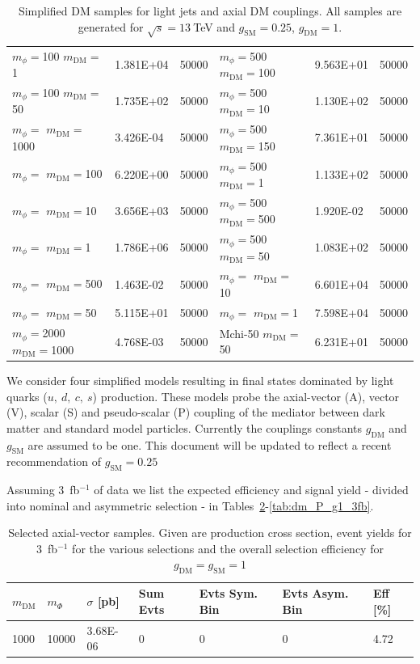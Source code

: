 \begin{table}[]
\begin{tabular}{lll||lll}
$m_\phi=$100 $m_\textrm{DM}=$1       & 1.381E+04 & 50000 & $m_\phi=$500 $m_\textrm{DM}=$100     & 9.563E+01 & 50000 \\
$m_\phi=$100 $m_\textrm{DM}=$50      & 1.735E+02 & 50000 & $m_\phi=$500 $m_\textrm{DM}=$10      & 1.130E+02 & 50000 \\
$m_\phi=$ $m_\textrm{DM}=$1000     & 3.426E-04 & 50000 & $m_\phi=$500 $m_\textrm{DM}=$150     & 7.361E+01 & 50000 \\
$m_\phi=$ $m_\textrm{DM}=$100      & 6.220E+00 & 50000 & $m_\phi=$500 $m_\textrm{DM}=$1       & 1.133E+02 & 50000 \\
$m_\phi=$ $m_\textrm{DM}=$10       & 3.656E+03 & 50000 & $m_\phi=$500 $m_\textrm{DM}=$500     & 1.920E-02 & 50000 \\
$m_\phi=$ $m_\textrm{DM}=$1        & 1.786E+06 & 50000 & $m_\phi=$500 $m_\textrm{DM}=$50      & 1.083E+02 & 50000 \\
$m_\phi=$ $m_\textrm{DM}=$500      & 1.463E-02 & 50000 & $m_\phi=$ $m_\textrm{DM}=$10       & 6.601E+04 & 50000 \\
$m_\phi=$ $m_\textrm{DM}=$50       & 5.115E+01 & 50000 & $m_\phi=$ $m_\textrm{DM}=$1        & 7.598E+04 & 50000 \\
$m_\phi=$2000 $m_\textrm{DM}=$1000   & 4.768E-03 & 50000 & Mchi-50 $m_\textrm{DM}=$50       & 6.231E+01 & 50000 \\
\hline
\end{tabular}
\caption{Simplified DM samples for light jets and axial DM couplings. All samples are generated for $\sqrt{s}=13~$TeV and $g_\textrm{SM}=0.25$, $g_\textrm{DM}=1$.}
\label{tab:samples_a}
\end{table}




We consider four simplified models resulting in final states dominated by light quarks ($u,~d,~c,~s$) production. These models probe the axial-vector (A), vector (V), scalar (S) and pseudo-scalar (P) coupling of the mediator between dark matter and standard model particles. Currently the couplings constants $g_\textrm{DM}$ and $g_\textrm{SM}$ are assumed to be one. This document will be updated to reflect a recent recommendation of $g_\textrm{SM}=0.25$

Assuming 3~fb$^{-1}$ of data we list the expected efficiency and signal yield - divided into nominal and asymmetric selection - in Tables~\ref{tab:dm_A_g1_3fb}-\ref{tab:dm_P_g1_3fb}.

\begin{table}[h!]
\small
\centering
\begin{tabular}{lllllll}
\hline
$m_\textrm{DM}$ & $m_\Phi$  & $\sigma$ [pb] & Sum Evts       & Evts Sym. Bin & Evts Asym. Bin & Eff  [\%]   \\\hline
1000 & 10000 & 3.68E-06 & 0        & 0        & 0        & 4.72 \\
\hline
\hline
\end{tabular}
\caption{Selected axial-vector samples. Given are production cross section, event yields for 3~fb$^{-1 }$ for the various selections and the overall selection efficiency for $g_\textrm{DM}=g_\textrm{SM}=1$}
\label{tab:dm_A_g1_3fb}
\end{table}


